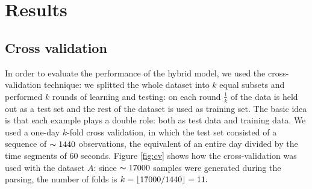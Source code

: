 \documentclass[10pt,a4paper]{article}
\DeclarePairedDelimiter\floor{\lfloor}{\rfloor}
\begin{document}
	\section{Results}
	\subsection{Cross validation}
	In order to evaluate the performance of the hybrid model, we used the cross-validation technique: we splitted the whole dataset into $k$ equal subsets and performed $k$ rounds of learning and testing: on each round $\frac{1}{k}$ of the data is held out as a test set and the rest of the dataset is used as training set. The basic idea is that each example plays a double role: both as test data and training data.
We used a one-day $k$-fold cross validation, in which the test set consisted of a sequence of $\thicksim 1440$ observations, the equivalent of an entire day divided by the time segments of $60$ seconds. Figure \ref{fig:cv} shows how the cross-validation was used with the dataset $A$: since $\thicksim 17000$ samples were generated during the parsing, the number of folds is $k = \floor{17000/1440} = 11.$	
\end{document}
